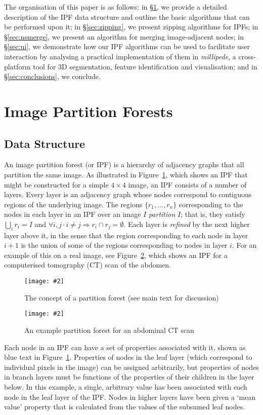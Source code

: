 \documentclass[a4paper]{article}
\newcommand{\stufigex}[5]					%
{
	\begin{figure}[#5]
	\begin{center}
		\texttt{[image: \#2]}
		\caption{#3}
		\label{#4}
	\end{center}
	\end{figure}
}
\begin{document}
The organisation of this paper is as follows: in \S\ref{sec:ipfs}, we provide a detailed description of the IPF data structure and outline the basic algorithms that can be performed upon it; in \S\ref{sec:zipping}, we present zipping algorithms for IPFs; in \S\ref{sec:nsmerge}, we present an algorithm for merging image-adjacent nodes; in \S\ref{sec:ui}, we demonstrate how our IPF algorithms can be used to facilitate user interaction by analysing a practical implementation of them in \emph{millipede}, a cross-platform tool for 3D segmentation, feature identification and visualisation; and in \S\ref{sec:conclusions}, we conclude.

\section{Image Partition Forests}
\label{sec:ipfs}

\subsection{Data Structure}

An image partition forest (or IPF) is a hierarchy of adjacency graphs that all partition the same image. As illustrated in Figure~\ref{fig:ipfs-concept}, which shows an IPF that might be constructed for a simple $4 \times 4$ image, an IPF consists of a number of layers. Every layer is an adjacency graph whose nodes correspond to contiguous regions of the underlying image. The regions $\{r_1,...,r_n\}$ corresponding to the nodes in each layer in an IPF over an image $I$ \emph{partition} $I$; that is, they satisfy $\bigcup_i r_i = I$ and $\forall i, j \cdot i \ne j \Rightarrow r_i \cap r_j = \emptyset$. Each layer is \emph{refined} by the next higher layer above it, in the sense that the region corresponding to each node in layer $i + 1$ is the union of some of the regions corresponding to nodes in layer $i$. For an example of this on a real image, see Figure~\ref{fig:ipfs-ctconcept}, which shows an IPF for a computerised tomography (CT) scan of the abdomen.

\stufigex{height=19cm}{ipfs-concept.png}{The concept of a partition forest (see main text for discussion)}{fig:ipfs-concept}{p}

\stufigex{height=19cm}{ipfs-ctconcept.png}{An example partition forest for an abdominal CT scan}{fig:ipfs-ctconcept}{p}

Each node in an IPF can have a set of properties associated with it, shown as blue text in Figure~\ref{fig:ipfs-concept}. Properties of nodes in the leaf layer (which correspond to individual pixels in the image) can be assigned arbitrarily, but properties of nodes in branch layers must be functions of the properties of their children in the layer below. In this example, a single, arbitrary value has been associated with each node in the leaf layer of the IPF. Nodes in higher layers have been given a `mean value' property that is calculated from the values of the subsumed leaf nodes.
\end{document}
